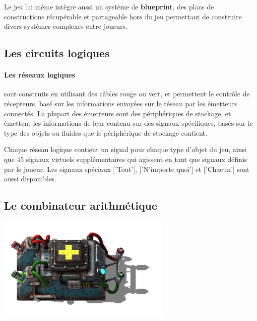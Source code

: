 \documentclass{scrreprt}
\begin{document}
	Le jeu lui même intègre aussi un système de \textbf{blueprint}, des plans de constructions récupérable et partageable hors du jeu permettant de construire divers systèmes complexes entre joueurs.
	
	
	\subsection{Les circuits logiques}
	
	\paragraph{Les réseaux logiques} 
	sont construits en utilisant des câbles rouge ou vert, et permettent le contrôle de récepteurs, basé sur les informations envoyées sur le réseau par les émetteurs connectés. 
	La plupart des émetteurs sont des périphériques de stockage, et émettent les informations de leur contenu sur des signaux spécifiques, basés sur le type des objets ou fluides que le périphérique de stockage contient. 
	
	Chaque réseau logique contient un signal pour chaque type d'objet du jeu, ainsi que 45 signaux virtuels supplémentaires qui agissent en tant que signaux définis par le joueur. 
	Les signaux spéciaux ['Tout'], ['N'importe quoi'] et ['Chacun'] sont aussi disponibles.
	
	
	
	
	\subsection{Le combinateur arithmétique}
	
	\begin{minipage}[t]{\textwidth}
		
		{
			\centering
			\includegraphics{pics/factorio-arithmetic.png}
		}
		
		
	\end{minipage} 
	
\end{document}

